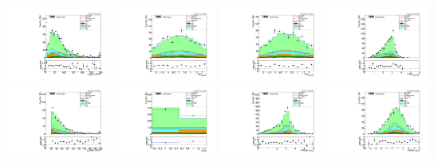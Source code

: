 \begin{figure}[!htb]
  \centering
  \captionsetup{justification=justified}
  \includegraphics[width=0.24\textwidth]{pics/VH_sec/valid_BDT_WH/H_pair_pt.pdf}
  \includegraphics[width=0.24\textwidth]{pics/VH_sec/valid_BDT_WH/muH1_eta.pdf}
  \includegraphics[width=0.24\textwidth]{pics/VH_sec/valid_BDT_WH/muH2_eta.pdf}
  \includegraphics[width=0.24\textwidth]{pics/VH_sec/valid_BDT_WH/muSS_muOS_dR.pdf}
  \includegraphics[width=0.24\textwidth]{pics/VH_sec/valid_BDT_WH/lep_pt.pdf}
  \includegraphics[width=0.24\textwidth]{pics/VH_sec/valid_BDT_WH/nEles.pdf}
  \includegraphics[width=0.24\textwidth]{pics/VH_sec/valid_BDT_WH/lep_H_pair_dR.pdf}
  \includegraphics[width=0.24\textwidth]{pics/VH_sec/valid_BDT_WH/lep_H_pair_dEta.pdf}

\end{figure}
